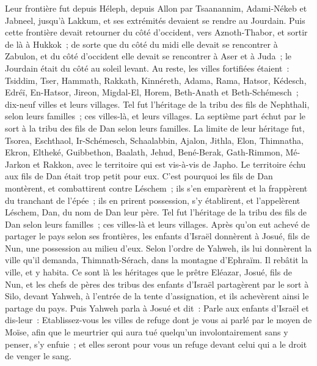 \begin{multicols}{2}
Leur frontière fut depuis Héleph, depuis Allon par Tsaanannim, Adami-Nékeb et Jabneel, jusqu'à Lakkum, et ses extrémités devaient se rendre au Jourdain.
Puis cette frontière devait retourner du côté d'occident, vers Aznoth-Thabor, et sortir de là à Hukkok~; de sorte que du côté du midi elle devait se rencontrer à Zabulon, et du côté d'occident elle devait se rencontrer à Aser et à Juda~; le Jourdain était du côté au soleil levant.
Au reste, les villes fortifiées étaient~: Tsiddim, Tser, Hammath, Rakkath, Kinnéreth,
Adama, Rama, Hatsor,
Kédesch, Edréï, En-Hatsor,
Jireon, Migdal-El, Horem, Beth-Anath et Beth-Schémesch~; dix-neuf villes et leurs villages.
Tel fut l'héritage de la tribu des fils de Nephthali, selon leurs familles~; ces villes-là, et leurs villages.
La septième part échut par le sort à la tribu des fils de Dan selon leurs familles.
La limite de leur héritage fut, Tsorea, Eschthaol, Ir-Schémesch,
Schaalabbin, Ajalon, Jithla,
Elon, Thimnatha, Ekron,
Eltheké, Guibbethon, Baalath,
Jehud, Bené-Berak, Gath-Rimmon,
Mé-Jarkon et Rakkon, avec le territoire qui est vis-à-vis de Japho.
Le territoire échu aux fils de Dan était trop petit pour eux. C'est pourquoi les fils de Dan montèrent, et combattirent contre Léschem~; ils s'en emparèrent et la frappèrent du tranchant de l'épée~; ils en prirent possession, s'y établirent, et l'appelèrent Léschem, Dan, du nom de Dan leur père.
Tel fut l'héritage de la tribu des fils de Dan selon leurs familles~; ces villes-là et leurs villages.
Après qu'on eut achevé de partager le pays selon ses frontières, les enfants d'Israël donnèrent à Josué, fils de Nun, une possession au milieu d'eux.
Selon l'ordre de Yahweh, ils lui donnèrent la ville qu'il demanda, Thimnath-Sérach, dans la montagne d'Ephraïm. Il rebâtit la ville, et y habita.
Ce sont là les héritages que le prêtre Eléazar, Josué, fils de Nun, et les chefs de pères des tribus des enfants d'Israël partagèrent par le sort à Silo, devant Yahweh, à l'entrée de la tente d'assignation, et ils achevèrent ainsi le partage du pays.
\VerseOne{}Puis Yahweh parla à Josué et dit~:
Parle aux enfants d'Israël et dis-leur~: Etablissez-vous les villes de refuge dont je vous ai parlé par le moyen de Moïse,
afin que le meurtrier qui aura tué quelqu'un involontairement sans y penser, s'y enfuie~; et elles seront pour vous un refuge devant celui qui a le droit de venger le sang.

\end{multicols}
